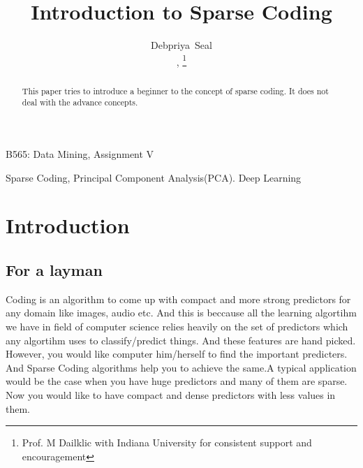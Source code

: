 \documentclass[journal]{IEEEtran}
\begin{document}
\title{ Introduction to Sparse Coding}

\author{Debpriya~Seal\\,%
\thanks{Prof. M Dailklic with Indiana University for consistent support and encouragement}%
}

%
{B565: Data Mining, Assignment V}
\maketitle


\begin{abstract}
This paper tries to introduce a beginner to the concept of sparse coding. It does not deal with the advance concepts.
\end{abstract}
\begin{IEEEkeywords}
Sparse Coding, Principal Component Analysis(PCA). Deep Learning
\end{IEEEkeywords}

\IEEEpeerreviewmaketitle

\section{Introduction}

\subsection{For a layman}
 Coding is an algorithm to come up with compact and more strong predictors for any domain like images, audio etc. And this is beccause all the learning algortihm we have in field of computer science relies heavily on the set of predictors which any algortihm uses to classify/predict things. And these features are hand picked. However, you would like computer him/herself to find the important predicters. And Sparse Coding algorithms help you to achieve the same.A typical application would be the case when you have huge predictors and many of them are sparse. Now you would like to have compact and dense predictors with less values in them.
\end{document}
